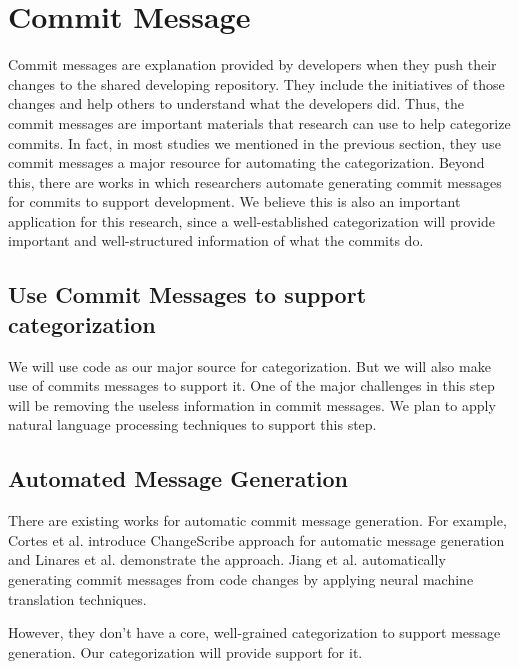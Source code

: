 \section{Commit Message}
\label{sec:message}

Commit messages are explanation provided by developers when they push their changes to the shared developing repository.
They include the initiatives of those changes and help others to understand what the developers did.
Thus, the commit messages are important materials that research can use to help categorize commits. 
In fact, in most studies we mentioned in the previous section, they use commit messages a major resource for automating the categorization.
Beyond this, there are works in which researchers automate generating commit messages for commits to support development.
We believe this is also an important application for this research, since a well-established categorization will provide important and well-structured information of what the commits do.

\subsection{Use Commit Messages to support categorization}

We will use code as our major source for categorization. 
But we will also make use of commits messages to support it.
One of the major challenges in this step will be removing the useless information in commit messages.
We plan to apply natural language processing techniques to support this step.

\subsection{Automated Message Generation}

There are existing works for automatic commit message generation. For example, Cortes et al. \cite{cortes2014automatically} introduce ChangeScribe approach for automatic message generation and Linares et al. \cite{linares2015changescribe} demonstrate the approach.
Jiang et al. \cite{jiang2017automatically } automatically generating commit messages from code changes by applying neural machine translation techniques.

However, they don't have a core, well-grained categorization to support message generation.
Our categorization will provide support for it.

